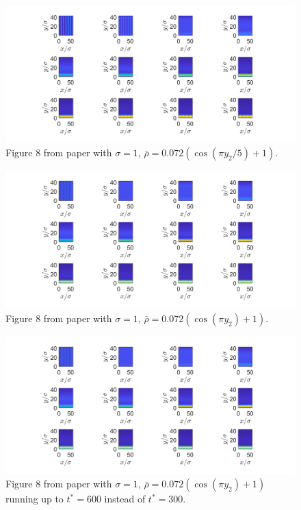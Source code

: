 \documentclass[11pt, a4paper]{article}
\theoremstyle{definition}
\begin{document}
\begin{figure}[h]
	\centering
	\includegraphics[scale=0.4]{Sed4.png}
	\caption{Figure 8 from paper with $\sigma = 1$, $\bar \rho = 0.072 (\cos(\pi y_2/5) +1 )$.} 
	\label{F1c}
\end{figure}
\begin{figure}[h]
	\centering
	\includegraphics[scale=0.4]{Sed5.png}
	\caption{Figure 8 from paper with $\sigma = 1$, $\bar \rho = 0.072 (\cos(\pi y_2) +1 )$.} 
	\label{F1d}
\end{figure}
\begin{figure}[h]
	\centering
	\includegraphics[scale=0.4]{Sed5.png}
	\caption{Figure 8 from paper with $\sigma = 1$, $\bar \rho = 0.072 (\cos(\pi y_2) +1 )$ running up to $t^* = 600$ instead of $t^* = 300$.} 
	\label{F1e}
\end{figure}
\end{document}
